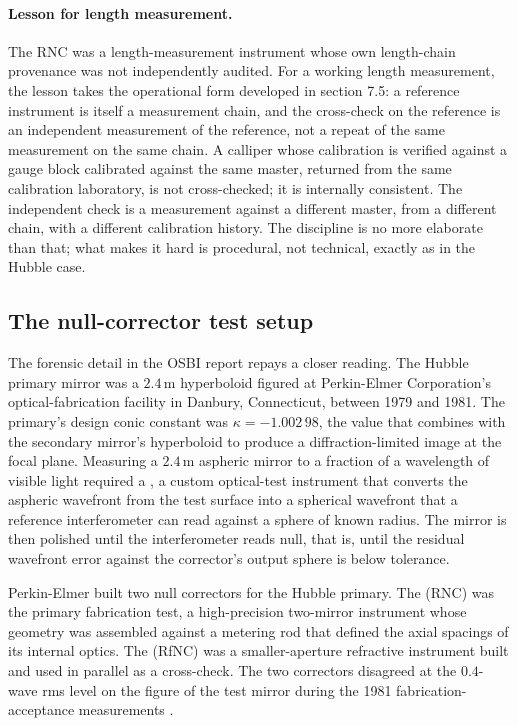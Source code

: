 \paragraph{Lesson for length measurement.}
The RNC was a length-measurement instrument whose own length-chain
provenance was not independently audited. For a working length
measurement, the lesson takes the operational form developed in
section 7.5: a reference instrument is itself a measurement chain,
and the cross-check on the reference is an independent measurement
of the reference, not a repeat of the same measurement on the same
chain. A calliper whose calibration is verified against a gauge
block calibrated against the same master, returned from the same
calibration laboratory, is not cross-checked; it is internally
consistent. The independent check is a measurement against a
different master, from a different chain, with a different
calibration history. The discipline is no more elaborate than
that; what makes it hard is procedural, not technical, exactly as
in the Hubble case.

\subsection{The null-corrector test setup}

The forensic detail in the OSBI report
\cite{acc:nasa-hubble-optical-systems-1990} repays a closer reading.
The Hubble primary mirror was a $2.4 \,\si{\meter}$ hyperboloid
figured at Perkin-Elmer Corporation's optical-fabrication facility
in Danbury, Connecticut, between 1979 and 1981. The primary's
design conic constant was $\kappa = -1.002\,98$, the value that
combines with the secondary mirror's hyperboloid to produce a
diffraction-limited image at the focal plane. Measuring a $2.4 \,
\si{\meter}$ aspheric mirror to a fraction of a wavelength of
visible light required a , a custom
optical-test instrument that converts the aspheric wavefront from
the test surface into a spherical wavefront that a reference
interferometer can read against a sphere of known radius. The
mirror is then polished until the interferometer reads null, that
is, until the residual wavefront error against the corrector's
output sphere is below tolerance.

Perkin-Elmer built two null correctors for the Hubble primary. The
 (RNC) was the primary fabrication
test, a high-precision two-mirror instrument whose geometry was
assembled against a metering rod that defined the axial spacings of
its internal optics. The  (RfNC)
was a smaller-aperture refractive instrument built and used in
parallel as a cross-check. The two correctors disagreed at the
$0.4$-wave rms level on the figure of the test mirror during the
1981 fabrication-acceptance measurements
\cite{acc:nasa-hubble-optical-systems-1990,ch07t3-text:chaisson-hubble-wars-1994}.

